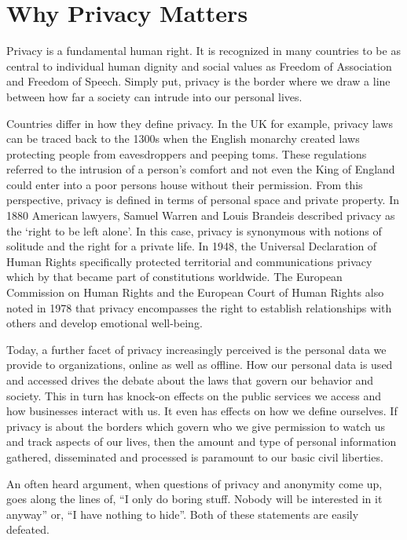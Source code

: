 \section{Why Privacy Matters}

Privacy is a fundamental human right. It is recognized in many countries
to be as central to individual human dignity and social values as
Freedom of Association and Freedom of Speech. Simply put, privacy is the
border where we draw a line between how far a society can intrude into
our personal lives.

Countries differ in how they define privacy. In the UK for example,
privacy laws can be traced back to the 1300s when the English monarchy
created laws protecting people from eavesdroppers and peeping toms.
These regulations referred to the intrusion of a person's comfort and
not even the King of England could enter into a poor persons house
without their permission. From this perspective, privacy is defined in
terms of personal space and private property. In 1880 American lawyers,
Samuel Warren and Louis Brandeis described privacy as the `right to be
left alone'. In this case, privacy is synonymous with notions of
solitude and the right for a private life. In 1948, the Universal
Declaration of Human Rights specifically protected territorial and
communications privacy which by that became part of constitutions
worldwide. The European Commission on Human Rights and the European
Court of Human Rights also noted in 1978 that privacy encompasses the
right to establish relationships with others and develop emotional
well-being.

Today, a further facet of privacy increasingly perceived is the personal
data we provide to organizations, online as well as offline. How our
personal data is used and accessed drives the debate about the laws that
govern our behavior and society. This in turn has knock-on effects on
the public services we access and how businesses interact with us. It
even has effects on how we define ourselves. If privacy is about the
borders which govern who we give permission to watch us and track
aspects of our lives, then the amount and type of personal information
gathered, disseminated and processed is paramount to our basic civil
liberties.

An often heard argument, when questions of privacy and anonymity come
up, goes along the lines of, ``I only do boring stuff. Nobody will be
interested in it anyway'' or, ``I have nothing to hide''. Both of these
statements are easily defeated.

